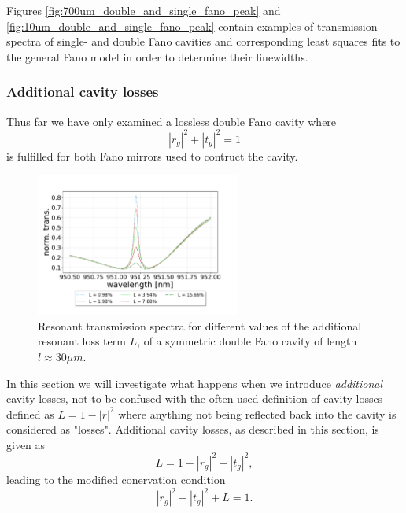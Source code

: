 Figures \ref{fig:700um_double_and_single_fano_peak} and \ref{fig:10um_double_and_single_fano_peak} contain examples of transmission spectra of single- and double Fano cavities and corresponding least squares fits to the general Fano model in order to determine their linewidths. 

\subsubsection{Additional cavity losses}\label{sec:additional_losses_theory}

Thus far we have only examined a lossless double Fano cavity where
\begin{equation}
    |r_g|^2 + |t_g|^2 = 1
\end{equation}
is fulfilled for both Fano mirrors used to contruct the cavity.

\begin{figure}[h!]
    \centering
    \includegraphics[width=0.6\textwidth]{figures/double_fano_loss_scan.pdf}
    \caption{Resonant transmission spectra for different values of the additional resonant loss term $L$, of a symmetric double Fano cavity of length $l \approx 30 \mu m$.}
    \label{fig:double_loss_scan}
\end{figure}

In this section we will investigate what happens when we introduce \emph{additional} cavity losses, not to be confused with the often used definition of cavity losses defined as $L=1-|r|^2$ where anything not being reflected back into the cavity is considered as "losses". Additional cavity losses, as described in this section, is given as
\begin{equation}
    L = 1 - |r_g|^2 - |t_g|^2,
\end{equation}
leading to the modified conervation condition
\begin{equation}
    |r_g|^2 + |t_g|^2 + L = 1.
\end{equation}

